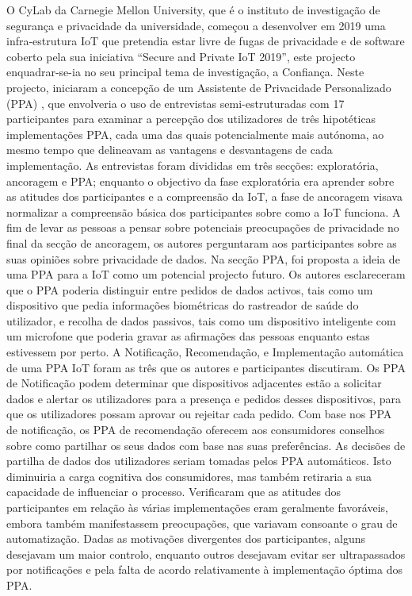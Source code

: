 \documentclass[conference]{IEEEtran}
\begin{document}

O CyLab da Carnegie Mellon University, que é o instituto de investigação de
segurança e privacidade da universidade, começou a desenvolver em 2019 uma
infra-estrutura IoT que pretendia estar livre de fugas de privacidade e de
software coberto pela sua iniciativa ``Secure and Private IoT 2019'', este
projecto enquadrar-se-ia no seu principal tema de investigação, a Confiança.
Neste projecto, iniciaram a concepção de um Assistente de Privacidade Personalizado
(PPA) \cite{ColnagoInforming}, que envolveria o uso de entrevistas semi-estruturadas
com 17 participantes para examinar a percepção dos utilizadores de três hipotéticas
implementações PPA, cada uma das quais potencialmente mais autónoma, ao mesmo
tempo que delineavam as vantagens e desvantagens de cada implementação. As
entrevistas foram divididas em três secções: exploratória, ancoragem e PPA;
enquanto o objectivo da fase exploratória era aprender sobre as atitudes dos
participantes e a compreensão da IoT, a fase de ancoragem visava normalizar
a compreensão básica dos participantes sobre como a IoT funciona. A fim de
levar as pessoas a pensar sobre potenciais preocupações de privacidade no final
da secção de ancoragem, os autores perguntaram aos participantes sobre as suas
opiniões sobre privacidade de dados. Na secção PPA, foi proposta a ideia de
uma PPA para a IoT como um potencial projecto futuro. Os autores esclareceram
que o PPA poderia distinguir entre pedidos de dados activos, tais como um dispositivo
que pedia informações biométricas do rastreador de saúde do utilizador, e recolha
de dados passivos, tais como um dispositivo inteligente com um microfone que
poderia gravar as afirmações das pessoas enquanto estas estivessem por perto.
A Notificação, Recomendação, e Implementação automática de uma PPA IoT foram
as três que os autores e participantes discutiram. Os PPA de Notificação podem
determinar que dispositivos adjacentes estão a solicitar dados e alertar os
utilizadores para a presença e pedidos desses dispositivos, para que os utilizadores
possam aprovar ou rejeitar cada pedido. Com base nos PPA de notificação, os
PPA de recomendação oferecem aos consumidores conselhos sobre como partilhar
os seus dados com base nas suas preferências. As decisões de partilha de dados
dos utilizadores seriam tomadas pelos PPA automáticos. Isto diminuiria a carga
cognitiva dos consumidores, mas também retiraria a sua capacidade de influenciar
o processo. Verificaram que as atitudes dos participantes em relação às várias
implementações eram geralmente favoráveis, embora também manifestassem preocupações,
que variavam consoante o grau de automatização. Dadas as motivações divergentes
dos participantes, alguns desejavam um maior controlo, enquanto outros desejavam
evitar ser ultrapassados por notificações e pela falta de acordo relativamente
à implementação óptima dos PPA.
\end{document}
